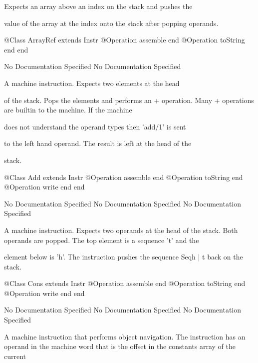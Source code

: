       Expects an array above an index on the stack and pushes the

      value of the array at the index onto the stack after popping 
      operands.
\begin{Interface}
@Class ArrayRef extends Instr
  @Operation assemble end
  @Operation toString end
end
\end{Interface}
No Documentation Specified
No Documentation Specified

      A machine instruction. Expects two elements at the head

      of the stack. Pops the elements and performs an + operation.
      Many + operations are builtin to the machine. If the machine

      does not understand the operand types then 'add/1' is sent

      to the left hand operand. The result is left at the head of the

      stack.
\begin{Interface}
@Class Add extends Instr
  @Operation assemble end
  @Operation toString end
  @Operation write end
end
\end{Interface}
No Documentation Specified
No Documentation Specified
No Documentation Specified

      A machine instruction. Expects two operands at the head of the stack.
      Both operands are popped. The top element is a sequence 't' and the

      element below is 'h'. The instruction pushes the sequence Seq{h | t}
      back on the stack.
\begin{Interface}
@Class Cons extends Instr
  @Operation assemble end
  @Operation toString end
  @Operation write end
end
\end{Interface}
No Documentation Specified
No Documentation Specified
No Documentation Specified

      A machine instruction that performs object navigation.
      The instruction has an operand in the machine word that 
      is the offset in the constants array of the current

